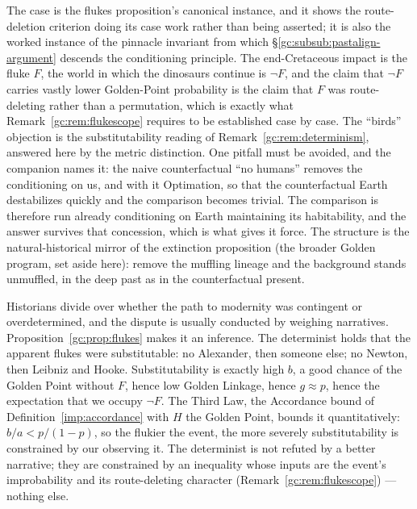 The case is the flukes proposition's canonical instance, and it
shows the route-deletion criterion doing its case work rather than
being asserted; it is also the worked instance of the pinnacle
invariant from which \S\ref{gc:subsub:pastalign-argument} descends
the conditioning principle. The end-Cretaceous impact is the fluke $F$, the
world in which the dinosaurs continue is $\neg F$, and the claim
that $\neg F$ carries vastly lower Golden-Point probability is the
claim that $F$ was route-deleting rather than a permutation, which
is exactly what Remark~\ref{gc:rem:flukescope} requires to be
established case by case. The ``birds'' objection is the
substitutability reading of Remark~\ref{gc:rem:determinism},
answered here by the metric distinction. One pitfall must be
avoided, and the companion names it: the naive counterfactual ``no
humans'' removes the conditioning on us, and with it Optimation, so
that the counterfactual Earth destabilizes quickly and the
comparison becomes trivial. The comparison is therefore run already
conditioning on Earth maintaining its habitability, and the answer
survives that concession, which is what gives it force. The
structure is the natural-historical mirror of the extinction
proposition (the broader Golden program, set aside here): remove the muffling lineage
and the background stands unmuffled, in the deep past as in the
counterfactual present.


\begin{remark}\label{gc:rem:determinism}
Historians divide over whether the path to modernity was contingent or
overdetermined, and the dispute is usually conducted by weighing
narratives. Proposition~\ref{gc:prop:flukes} makes it an inference. The determinist holds that the apparent flukes were substitutable: no
Alexander, then someone else; no Newton, then Leibniz and Hooke.
Substitutability is exactly high $b$, a good chance of the Golden
Point without $F$, hence low Golden Linkage, hence $g \approx p$,
hence the expectation that we occupy $\neg F$. The Third Law, the
Accordance bound of Definition~\ref{imp:accordance} with $H$ the Golden Point, bounds it quantitatively: $b/a < p/(1-p)$, so the flukier the event, the more
severely substitutability is constrained by our observing it. The
determinist is not refuted by a better narrative; they are constrained
by an inequality whose inputs are the event's improbability and its
route-deleting character (Remark~\ref{gc:rem:flukescope}) --- nothing
else.
\end{remark}

